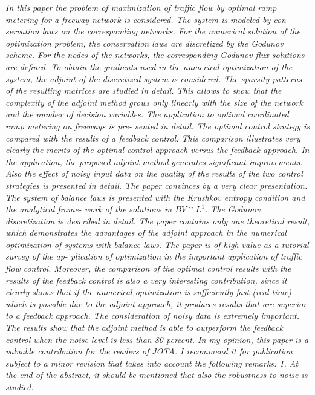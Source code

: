 \documentclass[10pt]{article}
\begin{document}
\emph{In this paper the problem of maximization of traffic flow by optimal ramp metering for a freeway network is considered. The system is modeled by con- servation laws on the corresponding networks.
For the numerical solution of the optimization problem, the conservation laws are discretized by the Godunov scheme. For the nodes of the networks, the corresponding Godunov flux solutions are defined. To obtain the gradients used in the numerical optimization of the system, the adjoint of the discretized system is considered. The sparsity patterns of the resulting matrices are studied in detail. This allows to show that the complexity of the adjoint method grows only linearly with the size of the network and the number of decision variables.
The application to optimal coordinated ramp metering on freeways is pre- sented in detail. The optimal control strategy is compared with the results of a feedback control. This comparison illustrates very clearly the merits of the optimal control approach versus the feedback approach. In the application, the proposed adjoint method generates significant improvements.
Also the effect of noisy input data on the quality of the results of the two control strategies is presented in detail.
The paper convinces by a very clear presentation. The system of balance laws is presented with the Krushkov entropy condition and the analytical frame- work of the solutions in $BV \cap L^1$. The Godunov discretization is described in detail. The paper contains only one theoretical result, which demonstrates the advantages of the adjoint approach in the numerical optimization of systems with balance laws. The paper is of high value as a tutorial survey of the ap- plication of optimization in the important application of traffic flow control. Moreover, the comparison of the optimal control results with the results of the feedback control is also a very interesting contribution, since it clearly shows that if the numerical optimization is sufficiently fast (real time) which is possible due to the adjoint approach, it produces results that are superior to a feedback approach.
The consideration of noisy data is extremely important. The results show that the adjoint method is able to outperform the feedback control when the noise level is less than 80 percent.
In my opinion, this paper is a valuable contribution for the readers of JOTA. I recommend it for publication subject to a minor revision that takes into account the following remarks.
1. At the end of the abstract, it should be mentioned that also the robustness to noise is studied.}\\
\end{document}
